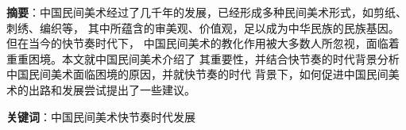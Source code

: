 
\noindent\textbf{摘要}：中国民间美术经过了几千年的发展，已经形成多种民间美术形式，如剪纸、刺绣、编织等，
其中所蕴含的审美观、价值观，足以成为中华民族的民族基因。但在当今的快节奏时代下，
中国民间美术的教化作用被大多数人所忽视，面临着重重困境。本文就中国民间美术介绍了
其重要性，并结合快节奏的时代背景分析中国民间美术面临困境的原因，并就快节奏的时代
背景下，如何促进中国民间美术的出路和发展尝试提出了一些建议。


\noindent\textbf{关键词}：中国民间美术\quad 快节奏时代\quad 发展